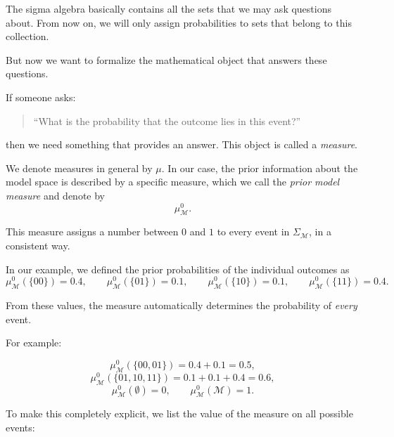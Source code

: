 \documentclass[11pt]{article}
\theoremstyle{remark}
\newcommand{\modelspace}{\mathcal{M}}
\begin{document}
\vspace{2mm}
The sigma algebra basically contains all the sets that we may ask questions about. From now on, we will only assign probabilities to sets that belong to this collection.

\vspace{2mm}

But now we want to formalize the mathematical object that answers these questions.

If someone asks:
\begin{quote}
``What is the probability that the outcome lies in this event?''
\end{quote}
then we need something that provides an answer. This object is called a \emph{measure}.

\vspace{2mm}

We denote measures in general by \(\mu\). In our case, the prior information about the model space is described by a specific measure, which we call the \emph{prior model measure} and denote by
\[
\mu_{\modelspace}^0.
\]

This measure assigns a number between \(0\) and \(1\) to every event in \(\Sigma_{\modelspace}\), in a consistent way.

\vspace{2mm}

In our example, we defined the prior probabilities of the individual outcomes as
\[
\mu_{\modelspace}^0(\{00\})=0.4,\qquad
\mu_{\modelspace}^0(\{01\})=0.1,\qquad
\mu_{\modelspace}^0(\{10\})=0.1,\qquad
\mu_{\modelspace}^0(\{11\})=0.4.
\]

From these values, the measure automatically determines the probability of \emph{every} event.

\vspace{2mm}

For example:

\[
\mu_{\modelspace}^0(\{00,01\}) = 0.4 + 0.1 = 0.5,
\]
\[
\mu_{\modelspace}^0(\{01,10,11\}) = 0.1 + 0.1 + 0.4 = 0.6,
\]
\[
\mu_{\modelspace}^0(\emptyset) = 0, \qquad
\mu_{\modelspace}^0(\modelspace) = 1.
\]

\vspace{2mm}

To make this completely explicit, we list the value of the measure on all possible events:
\end{document}
